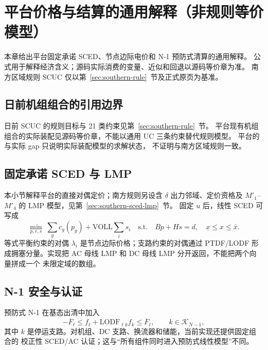 \section{平台价格与结算的通用解释（非规则等价模型）}\label{sec:market-theory}

\begin{theorynote}
本章给出平台固定承诺 SCED、节点边际电价和 N-1 预防式清算的通用解释。
公式用于解释经济含义；源码实际消费的变量、近似和回退以源码等价章为准。
南方区域规则 SCUC 仅以第~\ref{sec:southern-rule}~节及正式原页为基准。
\end{theorynote}

\subsection{日前机组组合的引用边界}
日前 SCUC 的规则目标与 21 类约束见第~\ref{sec:southern-rule}~节。
平台现有机组组合的实际装配见源码等价章，不能以通用 UC 三条约束替代规则模型。
平台的  与实际 gap 只说明实际装配模型的求解状态，
不证明与南方区域规则一致。

\subsection{固定承诺 SCED 与 LMP}
本小节解释平台的直接对偶定价；南方规则另设含 $\delta$ 出力邻域、定价资格及
$M'_1$--$M'_4$ 的 LMP 模型，见第~\ref{sec:southern-sced-lmp}~节。
固定 $u$ 后，线性 SCED 可写成
\begin{equation}
\min_{p,r,s}\;\sum_g c_g(p_g)+\mathrm{VOLL}\sum_i s_i
\quad\text{s.t.}\quad Bp+Hs=d,
\quad \underline x\le x\le\overline x.
\end{equation}
等式平衡约束的对偶 $\lambda_i$ 是节点边际价格；支路约束的对偶通过 PTDF/LODF
形成拥塞分量。实现把 AC 母线 LMP 和 DC 母线 LMP 分开返回，不能把两个向量拼成一个
未限定域的数组。

\subsection{N-1 安全与认证}
预防式 N-1 在基态出清中加入
\begin{equation}
 -\overline F_\ell\le f_\ell+\mathrm{LODF}_{\ell k}f_k\le\overline F_\ell,
 \qquad k\in\mathcal K_{N-1},
\end{equation}
其中 $k$ 是停运支路。对机组、DC 支路、换流器和储能，当前实现还提供固定组合的
校正性 SCED/AC 认证；这与“所有组件同时进入预防式线性模型”不同。

